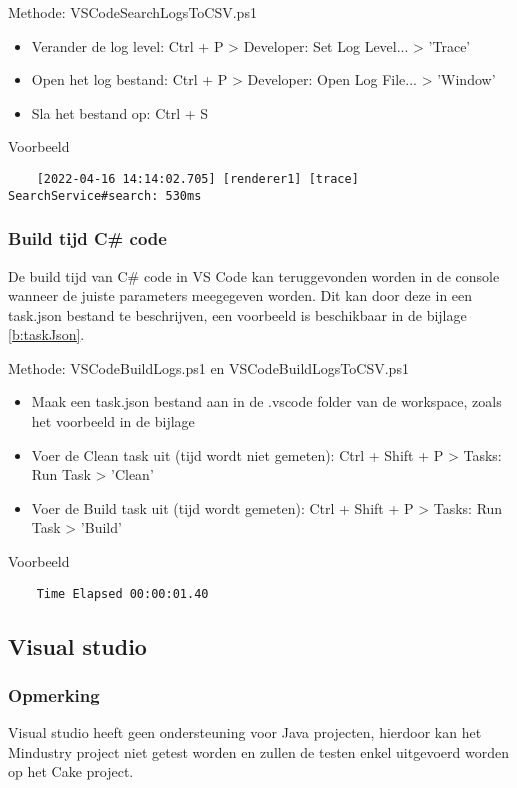 Methode: VSCodeSearchLogsToCSV.ps1
\begin{itemize}
	\item Verander de log level: Ctrl + P > Developer: Set Log Level... > 'Trace'
	\item Open het log bestand: Ctrl + P > Developer: Open Log File... > 'Window'
	\item Sla het bestand op: Ctrl + S
\end{itemize}

Voorbeeld
\vspace{\verbatimOffset}
\begin{verbatim}
    [2022-04-16 14:14:02.705] [renderer1] [trace] SearchService#search: 530ms
\end{verbatim}

\subsubsection{Build tijd C\# code}
De build tijd van C\# code in VS Code kan teruggevonden worden in de console wanneer de juiste parameters meegegeven worden. Dit kan door deze in een task.json bestand te beschrijven, een voorbeeld is beschikbaar in de bijlage \ref{b:taskJson}.

Methode: VSCodeBuildLogs.ps1 en VSCodeBuildLogsToCSV.ps1
\begin{itemize}
	\item	Maak een task.json bestand aan in de .vscode folder van de workspace, zoals het voorbeeld in de bijlage
	\item Voer de Clean task uit (tijd wordt niet gemeten): Ctrl + Shift + P > Tasks: Run Task > 'Clean'
	\item Voer de Build task uit (tijd wordt gemeten): Ctrl + Shift + P > Tasks: Run Task > 'Build'
\end{itemize}

Voorbeeld
\vspace{\verbatimOffset}
\begin{verbatim}
    Time Elapsed 00:00:01.40
\end{verbatim}

\subsection{Visual studio}

\subsubsection{Opmerking}
Visual studio heeft geen ondersteuning voor Java projecten, hierdoor kan het Mindustry project niet getest worden en zullen de testen enkel uitgevoerd worden op het Cake project.

